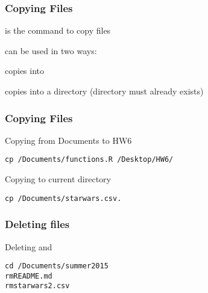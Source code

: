 \documentclass[12pt]{beamer}\usepackage[]{graphicx}\usepackage[]{color}
\makeatletter
\newenvironment{kframe}{%
 \def\at@end@of@kframe{}%
 \ifinner\ifhmode%
  \def\at@end@of@kframe{\end{minipage}}%
  \begin{minipage}{\columnwidth}%
 \fi\fi%
 \def\FrameCommand##1{\hskip\@totalleftmargin \hskip-\fboxsep
 \colorbox{shadecolor}{##1}\hskip-\fboxsep
     \hskip-\linewidth \hskip-\@totalleftmargin \hskip\columnwidth}%
 \MakeFramed {\advance\hsize-\width
   \@totalleftmargin\z@ \linewidth\hsize
   \@setminipage}}%
 {\par\unskip\endMakeFramed%
 \at@end@of@kframe}
\newenvironment{knitrout}{}{} %
\makeatother
\begin{document}

\begin{frame}
\frametitle{Copying Files}
\bi
  \item {} is the command to copy files
  \item {} can be used in two ways:
  \item {} copies  into 
  \item {} copies  into a directory (directory must already exists)
\ei
\end{frame}


\begin{frame}[fragile]
\frametitle{Copying Files}

Copying  from Documents to HW6
\begin{knitrout}\footnotesize
{}\color{fgcolor}\begin{kframe}
\begin{alltt}
cp ~/Documents/functions.R ~/Desktop/HW6/
\end{alltt}
\end{kframe}
\end{knitrout}

\bigskip
Copying  to current directory
\begin{knitrout}\footnotesize
{}\color{fgcolor}\begin{kframe}
\begin{alltt}
cp ~/Documents/starwars.csv .
\end{alltt}
\end{kframe}
\end{knitrout}

\end{frame}


\begin{frame}[fragile]
\frametitle{Deleting files}

Deleting  and 
\begin{knitrout}\footnotesize
{}\color{fgcolor}\begin{kframe}
\begin{alltt}
cd ~/Documents/summer2015
rm README.md
rm starwars2.csv
\end{alltt}
\end{kframe}
\end{knitrout}

\end{frame}
\end{document}
